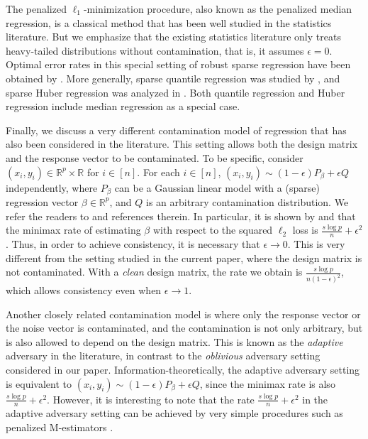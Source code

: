 The penalized $\ell_1$-minimization procedure, also known as the penalized median regression, is a classical method that has been well studied in the statistics literature. But we emphasize that the existing statistics literature only treats heavy-tailed distributions without contamination, that is, it assumes $\epsilon=0$. Optimal error rates in this special setting of robust sparse regression have been obtained by \cite{wang2013l1}. More generally, sparse quantile regression was studied by \cite{belloni2011l1}, and  sparse Huber regression was analyzed in \cite{loh2017statistical,sun2020adaptive}. Both quantile regression and Huber regression include median regression as a special case.

Finally, we discuss a very different contamination model of regression that has also been considered in the literature. This setting allows both the design matrix and the response vector to be contaminated. To be specific, consider $(x_i,y_i)\in\mathbb{R}^p\times\mathbb{R}$ for $i\in[n]$. For each $i\in[n]$, $(x_i,y_i)\sim (1-\epsilon)P_{\beta}+\epsilon Q$ independently, where $P_{\beta}$ can be a Gaussian linear model with a (sparse) regression vector $\beta\in\mathbb{R}^p$, and $Q$ is an arbitrary contamination distribution. We refer the readers to \cite{chen2013robust,balakrishnan2017computationally,diakonikolas2019efficient,liu2020high} and references therein. In particular, it is shown by \cite{chen2018robust} and \cite{gao2020robust} that the minimax rate of estimating $\beta$ with respect to the squared $\ell_2$ loss is $\frac{s\log p}{n}+\epsilon^2$. Thus, in order to achieve consistency, it is necessary that $\epsilon\rightarrow 0$.
This is very different from the setting studied in the current paper, where the design matrix is not contaminated. With a \textit{clean} design matrix, the rate we obtain is $\frac{s\log p}{n(1-\epsilon)^2}$, which allows consistency even when $\epsilon\rightarrow 1$.

Another closely related contamination model is where only the response vector or the noise vector is contaminated, and the contamination is not only arbitrary, but is also allowed to depend on the design matrix. This is known as the \textit{adaptive} adversary in the literature, in contrast to the \textit{oblivious} adversary setting considered in our paper. Information-theoretically, the adaptive adversary setting is equivalent to $(x_i,y_i)\sim (1-\epsilon)P_{\beta}+\epsilon Q$, since the minimax rate is also $\frac{s\log p}{n}+\epsilon^2$. However, it is interesting to note that the rate $\frac{s\log p}{n}+\epsilon^2$ in the adaptive adversary setting can be achieved by very simple procedures such as penalized M-estimators \citep{dalalyan2019outlier}.
